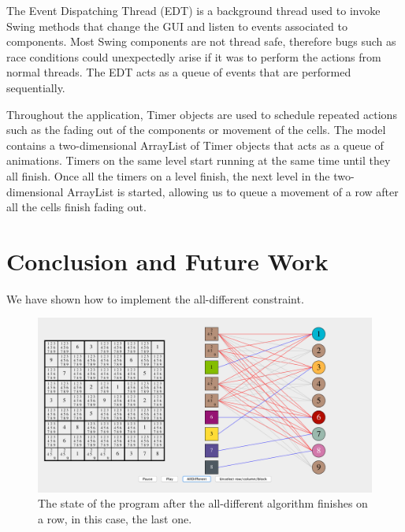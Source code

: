 \documentclass{l4proj}
\begin{document}
\noindent The Event Dispatching Thread (EDT) is a background thread used to invoke Swing methods that change the GUI and listen to events associated to components. Most Swing components are not thread safe, therefore bugs such as race conditions could unexpectedly arise if it was to perform the actions from normal threads. The EDT acts as a queue of events that are performed sequentially.

\noindent Throughout the application, Timer objects are used to schedule repeated actions such as the fading out of the components or movement of the cells. The model contains a two-dimensional ArrayList of Timer objects that acts as a queue of animations. Timers on the same level start running at the same time until they all finish. Once all the timers on a level finish, the next level in the two-dimensional ArrayList is started, allowing us to queue a movement of a row after all the cells finish fading out.


%

\chapter{Conclusion and Future Work}
\label{chap7conclusion}
We have shown how to implement the all-different constraint.

\begin{figure}[H]
\centering
\includegraphics[width=13.2cm]{screenshot.png}
\caption{The state of the program after the all-different algorithm finishes on a row, in this case, the last one.}
\end{figure}
\end{document}
